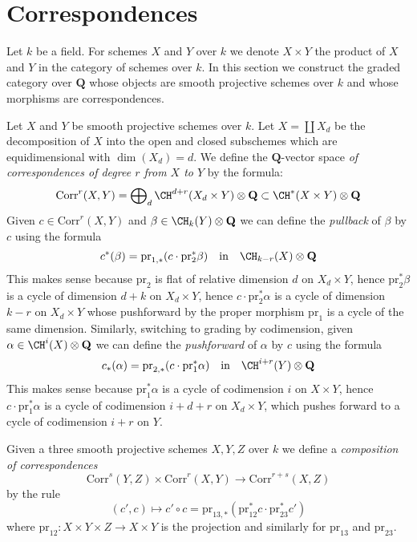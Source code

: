 \section{Correspondences}
\label{section-correspondences}

\noindent
Let $k$ be a field. For schemes $X$ and $Y$ over $k$ we denote
$X \times Y$ the product of $X$ and $Y$ in the category of schemes
over $k$. In this section we construct the graded category over
$\mathbf{Q}$ whose objects are smooth projective schemes over $k$ and whose
morphisms are correspondences.

\medskip\noindent
Let $X$ and $Y$ be smooth projective schemes over $k$.
Let $X = \coprod X_d$ be the decomposition of $X$ into
the open and closed subschemes which are equidimensional
with $\dim(X_d) = d$. We define the $\mathbf{Q}$-vector space
{\it of correspondences of degree $r$ from $X$ to $Y$}
by the formula:
$$
\text{Corr}^r(X, Y) =
\bigoplus\nolimits_d \CH^{d + r}(X_d \times Y) \otimes \mathbf{Q}
\subset
\CH^*(X \times Y) \otimes \mathbf{Q}
$$
Given $c \in \text{Corr}^r(X, Y)$ and $\beta \in \CH_k(Y) \otimes \mathbf{Q}$
we can define the {\it pullback} of $\beta$ by $c$ using the formula
$$
c^*(\beta) = \text{pr}_{1, *}(c \cdot \text{pr}_2^*\beta)
\quad\text{in}\quad
\CH_{k - r}(X) \otimes \mathbf{Q}
$$
This makes sense because $\text{pr}_2$ is flat of relative dimension
$d$ on $X_d \times Y$, hence $\text{pr}_2^*\beta$ is a cycle of
dimension $d + k$ on $X_d \times Y$, hence $c \cdot \text{pr}_2^*\alpha$
is a cycle of dimension $k - r$ on $X_d \times Y$ whose pushforward
by the proper morphism $\text{pr}_1$ is a cycle of the same dimension.
Similarly, switching to grading by codimension,
given $\alpha \in \CH^i(X) \otimes \mathbf{Q}$ we can define the
{\it pushforward} of $\alpha$ by $c$ using the formula
$$
c_*(\alpha) = \text{pr}_{2, *}(c \cdot \text{pr}_1^*\alpha)
\quad\text{in}\quad
\CH^{i + r}(Y) \otimes \mathbf{Q}
$$
This makes sense because $\text{pr}_1^*\alpha$ is a cycle of codimension
$i$ on $X \times Y$, hence $c \cdot \text{pr}_1^*\alpha$ is a cycle
of codimension $i + d + r$ on $X_d \times Y$, which pushes forward
to a cycle of codimension $i + r$ on $Y$.

\medskip\noindent
Given a three smooth projective schemes $X, Y, Z$ over $k$ we define a
{\it composition of correspondences}
$$
\text{Corr}^s(Y, Z)
\times
\text{Corr}^r(X, Y)
\longrightarrow
\text{Corr}^{r + s}(X, Z)
$$
by the rule
$$
(c', c)
\longmapsto
c' \circ c =
\text{pr}_{13, *}(\text{pr}_{12}^*c \cdot \text{pr}_{23}^*c')
$$
where $\text{pr}_{12} : X \times Y \times Z \to X \times Y$
is the projection and similarly for $\text{pr}_{13}$ and $\text{pr}_{23}$.

